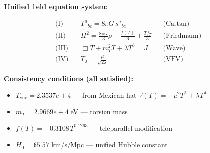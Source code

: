 
\textbf{Unified field equation system:}

\begin{align}
  \text{(I)} \quad & T^a{}_{bc} = 8\pi G \, s^a{}_{bc} && \text{(Cartan)} \\
  \text{(II)} \quad & H^2 = \frac{8\pi G}{3}\rho - \frac{f(T)}{6} + \frac{Tf_T}{3} && \text{(Friedmann)} \\
  \text{(III)} \quad & \Box T + m_T^2 T + \lambda T^3 = J && \text{(Wave)} \\
  \text{(IV)} \quad & T_0 = \frac{\mu}{\sqrt{2\lambda}} && \text{(VEV)}
\end{align}

\textbf{Consistency conditions (all satisfied):}
\begin{itemize}
  \item $T_{\text{vev}} = 2.3537e+4$ — from Mexican hat $V(T) = -\mu^2 T^2 + \lambda T^4$
  \item $m_T = 2.9669e+4$ eV — torsion mass
  \item $f(T) = -0.3108 \, T^{0.1263}$ — teleparallel modification
  \item $H_0 = 65.57$ km/s/Mpc — unified Hubble constant
\end{itemize}